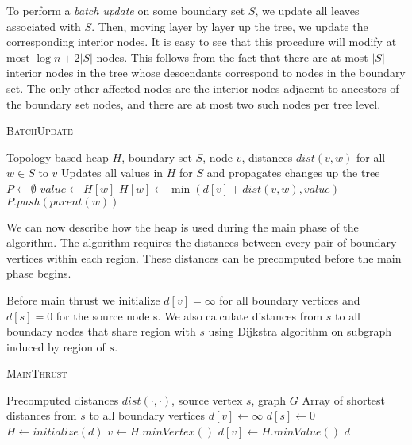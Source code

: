 To perform a \emph{batch update} on some boundary set $S$, we update all leaves associated with $S$. Then, moving layer by layer up the tree, we update the corresponding interior nodes. It is easy to see that this procedure will modify at most $\log n + 2|S|$ nodes. This follows from the fact that there are at most $|S|$ interior nodes in the tree whose descendants correspond to nodes in the boundary set. The only other affected nodes are the interior nodes adjacent to ancestors of the boundary set nodes, and there are at most two such nodes per tree level.

\begin{algorithm}
\caption{\textsc{BatchUpdate}}\label{batchupdate}
\begin{algorithmic}[1]
\Require Topology-based heap $H$, boundary set $S$, node $v$, distances $dist(v,w)$ for all $w \in S$ to $v$
\Ensure Updates all values in $H$ for $S$ and propagates changes up the tree
\State $P \gets \emptyset$ 
    \State $value \gets H[w]$
        \State $H[w] \gets \min(d[v] + dist(v,w), value)$    
        \State $P.push(parent(w))$
    \EndIf
\EndFor
{}
\end{algorithmic}
\end{algorithm}

We can now describe how the heap is used during the main phase of the algorithm. The algorithm requires the distances between every pair of boundary vertices within each region. These distances can be precomputed before the main phase begins.

Before main thrust we initialize $d[v] = \infty$ for all boundary vertices and $d[s] = 0$ for the source node s. We also calculate distances from $s$ to all boundary nodes that share region with $s$ using Dijkstra algorithm on subgraph induced by region of $s$.

\begin{algorithm}
\caption{\textsc{MainThrust}}\label{mainthrust}
\begin{algorithmic}[1]
\Require Precomputed distances $dist(\cdot,\cdot)$, source vertex $s$, graph $G$
\Ensure Array of shortest distances from $s$ to all boundary vertices
\State $d[v] \gets \infty$
\EndFor
\State $d[s] \gets 0$
\State $H \gets initialize(d)$ 
        \State {}
    \EndFor
\EndFor
{}
    \State $v \gets H.minVertex()$ 
    \State $d[v] \gets H.minValue()$
            \State {}
        \EndFor
    \EndFor
\EndWhile
\State \Return $d$
\end{algorithmic}
\end{algorithm}

